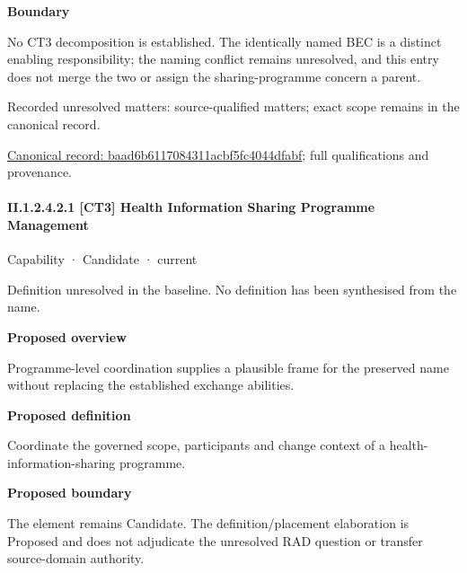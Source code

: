 \textbf{Boundary}



No CT3 decomposition is established. The identically named BEC is a distinct enabling responsibility; the naming conflict remains unresolved, and this entry does not merge the two or assign the sharing-programme concern a parent.


{\small Recorded unresolved matters: source-qualified matters; exact scope remains in the canonical record.}\par
{\footnotesize \href{../../../../continuum/strategy/capability/baad6b6117084311acbf5fc4044dfabf.md}{Canonical record: baad6b6117084311acbf5fc4044dfabf}; full qualifications and provenance.}\par
\paragraph*{II.1.2.4.2.1 [CT3] Health Information Sharing Programme Management}
\label{navigation:II.1.2.4.2.1}

\label{element:6c5c2cb625414b149ac7f2ccb4b8a897}
{\small Capability · Candidate · current}\par

Definition unresolved in the baseline. No definition has been synthesised from the name.



\textbf{Proposed overview}



Programme-level coordination supplies a plausible frame for the preserved name without replacing the established exchange abilities.



\textbf{Proposed definition}



Coordinate the governed scope, participants and change context of a health-information-sharing programme.



\textbf{Proposed boundary}



The element remains Candidate. The definition/placement elaboration is Proposed and does not adjudicate the unresolved RAD question or transfer source-domain authority.



